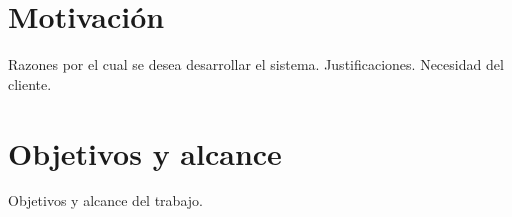 
\section{Motivación}

Razones por el cual se desea desarrollar el sistema. Justificaciones. Necesidad del cliente.


\section{Objetivos y alcance}

Objetivos y alcance del trabajo.


